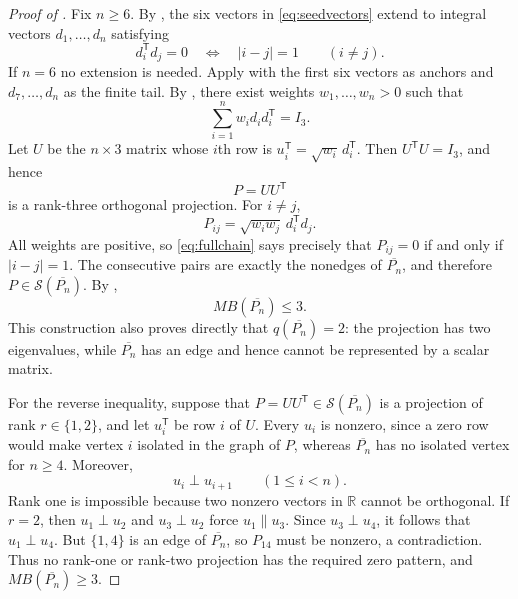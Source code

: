 \documentclass[10pt,a4paper]{amsart}
\newcommand{\R}{\mathbb{R}}
\newcommand{\cS}{\mathcal{S}}
\begin{document}
\begin{proof}[Proof of ]
Fix $n\ge6$.  By , the six vectors in
\eqref{eq:seedvectors} extend to integral vectors
$d_1,\ldots,d_n$ satisfying
\[
 d_i^{\mathsf T}d_j=0
 \quad\Longleftrightarrow\quad |i-j|=1
 \qquad(i\ne j).
\tag{4.6}\label{eq:fullchain}
\]
If $n=6$ no extension is needed.  Apply  with the first
six vectors as anchors and $d_7,\ldots,d_n$ as the finite tail.  By
, there exist weights $w_1,\ldots,w_n>0$ such that
\[
                 \sum_{i=1}^n w_i d_i d_i^{\mathsf T}=I_3.
\tag{4.7}\label{eq:fullparseval}
\]
Let $U$ be the $n\times3$ matrix whose $i$th row is
$u_i^{\mathsf T}=\sqrt{w_i}\,d_i^{\mathsf T}$.  Then
$U^{\mathsf T}U=I_3$, and hence
\[
                  P=UU^{\mathsf T}
\]
is a rank-three orthogonal projection.  For $i\ne j$,
\[
 P_{ij}=\sqrt{w_iw_j}\,d_i^{\mathsf T}d_j.
\]
All weights are positive, so \eqref{eq:fullchain} says precisely that
$P_{ij}=0$ if and only if $|i-j|=1$.  The consecutive pairs are exactly the
nonedges of $\overline{P_n}$, and therefore
$P\in\cS(\overline{P_n})$.  By ,
\[
                  MB(\overline{P_n})\le3.
\]
This construction also proves directly that $q(\overline{P_n})=2$: the
projection has two eigenvalues, while $\overline{P_n}$ has an edge and hence
cannot be represented by a scalar matrix.

For the reverse inequality, suppose that
$P=UU^{\mathsf T}\in\cS(\overline{P_n})$ is a projection of rank
$r\in\{1,2\}$, and let $u_i^{\mathsf T}$ be row $i$ of $U$.  Every $u_i$ is
nonzero, since a zero row would make vertex $i$ isolated in the graph of
$P$, whereas $\overline{P_n}$ has no isolated vertex for $n\ge4$.  Moreover,
\[
                 u_i\perp u_{i+1}\qquad(1\le i<n).
\tag{4.8}\label{eq:roworth}
\]
Rank one is impossible because two nonzero vectors in $\R$ cannot be
orthogonal.  If $r=2$, then $u_1\perp u_2$ and $u_3\perp u_2$ force
$u_1\parallel u_3$.  Since $u_3\perp u_4$, it follows that
$u_1\perp u_4$.  But $\{1,4\}$ is an edge of $\overline{P_n}$, so
$P_{14}$ must be nonzero, a contradiction.  Thus no rank-one or rank-two
projection has the required zero pattern, and
$MB(\overline{P_n})\ge3$.
\end{proof}
\end{document}
